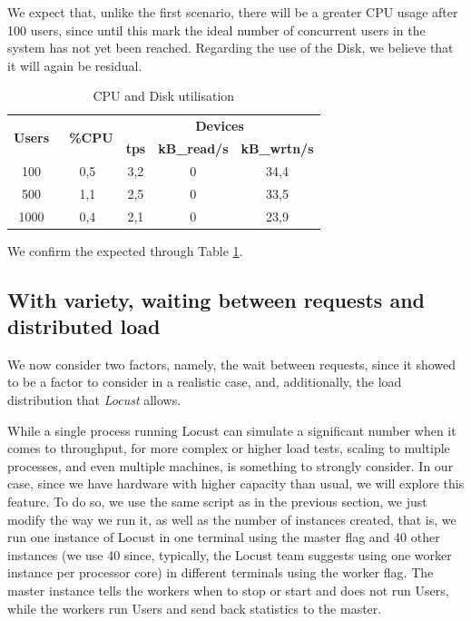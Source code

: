   We expect that, unlike the first scenario, there will be a greater CPU usage after 100 users, since until this mark the ideal number of concurrent users in the system has not yet been reached. Regarding the use of the Disk, we believe that it will again be residual.

\newpage

\begin{table}[h!]
\centering
\begin{tabular}{|c|c|c|c|c|} 
\hline
\multirow{2}{*}{\textbf{Users }} & \multirow{2}{*}{\textbf{~\%CPU}} & \multicolumn{3}{c|}{\textbf{Devices}}                     \\ 
\cline{3-5}
                                 &                                  & \textbf{tps} & \textbf{kB\_read/s} & \textbf{kB\_wrtn/s}  \\ 
\hline
100  & 0,5 & 3,2  & 0  &  34,4                   \\ 
\hline
500  & 1,1 & 2,5 & 0 & 33,5                    \\ 
\hline
1000 & 0,4 & 2,1 & 0 & 23,9                 \\ 
\hline
\end{tabular}\caption{\label{tab:cpu_waiting}CPU and Disk utilisation}
\end{table}

  We confirm the expected through Table \ref{tab:cpu_waiting}.
 

  \subsection{With variety, waiting between requests and distributed load}

  We now consider two factors, namely, the wait between requests, since it showed to be a factor to consider in a realistic case, and, additionally, the load distribution that \textit{Locust} allows.
  
  While a single process running Locust can simulate a significant number when it comes to throughput, for more complex or higher load tests, scaling to multiple processes, and even multiple machines, is something to strongly consider. In our case, since we have hardware with higher capacity than usual, we will explore this feature. To do so, we use the same script as in the previous section, we just modify the way we run it, as well as the number of instances created, that is, we run one instance of Locust in one terminal using the master flag and 40 other instances (we use 40 since, typically, the Locust team suggests using one worker instance per processor core) in different terminals using the worker flag. The master instance tells the workers when to stop or start and does not run Users, while the workers run Users and send back statistics to the master.
  

